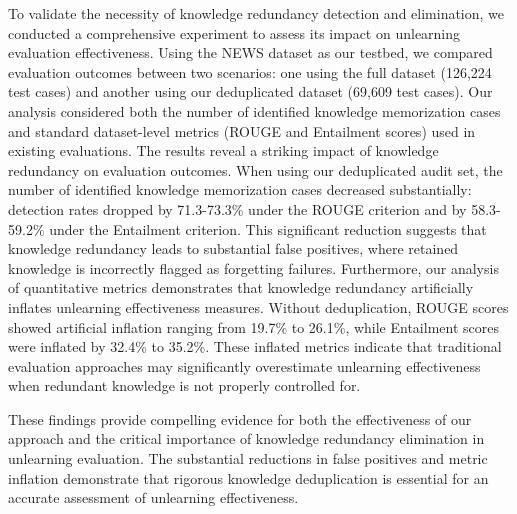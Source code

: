 To validate the necessity of knowledge redundancy detection and elimination, we conducted a comprehensive experiment to assess its impact on unlearning evaluation effectiveness. Using the NEWS dataset as our testbed, we compared evaluation outcomes between two scenarios: one using the full dataset (126,224 test cases) and another using our deduplicated dataset (69,609 test cases). Our analysis considered both the number of identified knowledge memorization cases and standard dataset-level metrics (ROUGE and Entailment scores) used in existing evaluations.
The results reveal a striking impact of knowledge redundancy on evaluation outcomes. When using our deduplicated audit set, the number of identified knowledge memorization cases decreased substantially: detection rates dropped by 71.3-73.3\% under the ROUGE criterion and by 58.3-59.2\% under the Entailment criterion. This significant reduction suggests that knowledge redundancy leads to substantial false positives, where retained knowledge is incorrectly flagged as forgetting failures.
Furthermore, our analysis of quantitative metrics demonstrates that knowledge redundancy artificially inflates unlearning effectiveness measures. Without deduplication, ROUGE scores showed artificial inflation ranging from 19.7\% to 26.1\%, while Entailment scores were inflated by 32.4\% to 35.2\%. These inflated metrics indicate that traditional evaluation approaches may significantly overestimate unlearning effectiveness when redundant knowledge is not properly controlled for.

These findings provide compelling evidence for both the effectiveness of our approach and the critical importance of knowledge redundancy elimination in unlearning evaluation. The substantial reductions in false positives and metric inflation demonstrate that rigorous knowledge deduplication is essential for an accurate assessment of unlearning effectiveness.

% 



